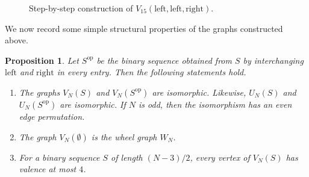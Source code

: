 \documentclass[11pt]{article}
\theoremstyle{definition}
\theoremstyle{plain}
\newtheorem{proposition}[definition]{Proposition}
\newcommand{\LeftChoice}{\mathrm{left}}
\newcommand{\RightChoice}{\mathrm{right}}
\begin{document}
\begin{figure}[H]
\begin{minipage}{0.19\linewidth}
{}
\caption*{Close the arc}
\end{minipage}
\caption{Step-by-step construction of $V_{15}(\LeftChoice,\LeftChoice,\RightChoice)$.}
\label{fig:V15-construction}
\end{figure}

We now record some simple structural properties of the graphs constructed above.

\begin{proposition}\label{prop:VN-properties}
Let $S^{\mathrm{op}}$ be the binary sequence obtained from $S$ by interchanging $\LeftChoice$ and $\RightChoice$ in every entry.
Then the following statements hold.
\begin{enumerate}[itemsep=0.35em, topsep=0.35em]
\item \label{it:lr_iso} The graphs $V_N(S)$ and $V_N(S^{\mathrm{op}})$ are isomorphic. 
Likewise, $U_N(S)$ and $U_N(S^{\mathrm{op}})$ are isomorphic. 
If $N$ is odd, then the isomorphism has an even edge permutation.

\item \label{it:V_is_wheel} The graph $V_N(\emptyset)$ is the wheel graph $W_N$.

\item \label{it:V_low_valence} For a binary sequence $S$ of length $(N-3)/2$, every vertex of $V_N(S)$ has valence at most $4$.
\end{enumerate}
\end{proposition}
\end{document}
